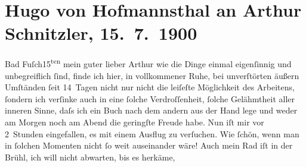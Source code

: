 

         
         \renewcommand{\erwaehntePersonen}{Personen: Richard Beer-Hofmann, Hugo von Hofmannsthal, Hugo August von Hofmannsthal, Anna von Hofmannsthal}
         \renewcommand{\erwaehnteOrte}{Orte: Bad Fusch, Brühl, Golling, Hintersee, Saalfelden am Steinernen Meer, Salzburg, Wien}
         \renewcommand{\erwaehnteWerke}{}
               \section[Hugo von Hofmannsthal an Arthur Schnitzler, 15. 7. 1900]{ Hugo von Hofmannsthal an Arthur Schnitzler, 15. 7. 1900}\nopagebreak{}\rehead{ }\begin{ledgroupsized}[t]{13cm}\normalsize\beginnumbering{} \toendnotes[C]{\smallbreak\pagebreak[2]} 
\toendnotes[C]{\smallbreak}\pstart
           \raggedleft{}{\pb}Bad Fuſch15\textsuperscript{ten}\pend
           \pstart{}mein guter lieber Arthur\pend\pstart
           wie die Dinge einmal eigenſinnig und unbegreiflich ſind, finde ich hier, in
               vollkommener Ruhe, bei unverſtörten äußern Umſtänden ſeit 14 Tagen nicht nur nicht
               die leiſeſte Möglichkeit des Arbeitens, ſondern ich verſinke auch in eine ſolche
               Verdroſſenheit, ſolche Gelähmtheit aller inneren Sinne, {\pb}daſs ich ein Buch nach dem andern
               aus der Hand lege und weder am Morgen noch am Abend die geringſte Freude habe. Nun
               iſt mir vor 2 Stunden eingefallen, es mit einem Ausflug zu verſuchen. Wie ſchön, wenn
               man in ſolchen Momenten nicht ſo weit auseinander wäre! Auch mein Rad iſt in der {\pb}Brühl, ich will nicht abwarten, bis es herkäme,

\end{ledgroupsized}
